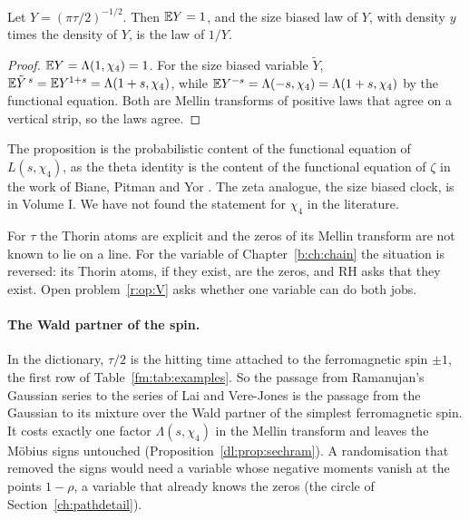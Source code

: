 \begin{proposition}\label{r:prop:sizebias}
Let $Y=(\pi\tau/2)^{-1/2}$. Then $\mathbb{E} Y=1$, and the size biased law of $Y$, with density $y$ times the density of $Y$, is the law of $1/Y$.
\end{proposition}

\begin{proof}
$\mathbb{E} Y=\Lambda(1,\chi_4)=1$. For the size biased variable $\tilde Y$, $\mathbb{E}\tilde Y^{\,s}=\mathbb{E} Y^{1+s}=\Lambda(1+s,\chi_4)$, while $\mathbb{E} Y^{-s}=\Lambda(-s,\chi_4)=\Lambda(1+s,\chi_4)$ by the functional equation. Both are Mellin transforms of positive laws that agree on a vertical strip, so the laws agree.
\end{proof}

The proposition is the probabilistic content of the functional equation of $L(s,\chi_4)$, as the theta identity is the content of the functional equation of $\zeta$ in the work of Biane, Pitman and Yor \cite{BPY01}. The zeta analogue, the size biased clock, is in Volume I. We have not found the statement for $\chi_4$ in the literature.

For $\tau$ the Thorin atoms are explicit and the zeros of its Mellin transform are not known to lie on a line. For the variable of Chapter~\ref{b:ch:chain} the situation is reversed: its Thorin atoms, if they exist, are the zeros, and RH asks that they exist. Open problem~\ref{r:op:V} asks whether one variable can do both jobs.

\paragraph{The Wald partner of the spin.} In the dictionary, $\tau/2$ is the hitting time attached to the ferromagnetic spin $\pm1$, the first row of Table~\ref{fm:tab:examples}. So the passage from Ramanujan's Gaussian series to the series of Lai and Vere-Jones is the passage from the Gaussian to its mixture over the Wald partner of the simplest ferromagnetic spin. It costs exactly one factor $\Lambda(s,\chi_4)$ in the Mellin transform and leaves the M\"obius signs untouched (Proposition~\ref{dl:prop:sechram}). A randomisation that removed the signs would need a variable whose negative moments vanish at the points $1-\rho$, a variable that already knows the zeros (the circle of Section~\ref{ch:pathdetail}).

